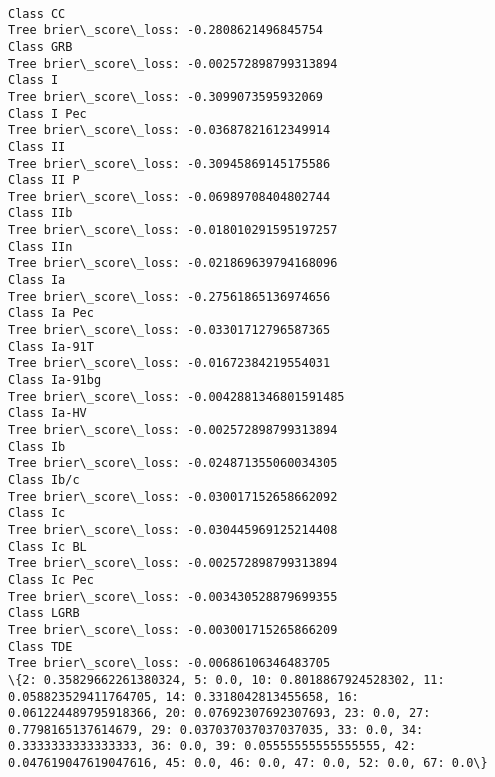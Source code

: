 \documentclass[11pt]{article}
\begin{document}
    \begin{center}
    \end{center}
    { \hspace*{\fill} \\}
    
    \begin{Verbatim}[commandchars=\\\{\}]
Class CC
Tree brier\_score\_loss: -0.2808621496845754
Class GRB
Tree brier\_score\_loss: -0.002572898799313894
Class I
Tree brier\_score\_loss: -0.3099073595932069
Class I Pec
Tree brier\_score\_loss: -0.03687821612349914
Class II
Tree brier\_score\_loss: -0.30945869145175586
Class II P
Tree brier\_score\_loss: -0.06989708404802744
Class IIb
Tree brier\_score\_loss: -0.018010291595197257
Class IIn
Tree brier\_score\_loss: -0.021869639794168096
Class Ia
Tree brier\_score\_loss: -0.27561865136974656
Class Ia Pec
Tree brier\_score\_loss: -0.03301712796587365
Class Ia-91T
Tree brier\_score\_loss: -0.01672384219554031
Class Ia-91bg
Tree brier\_score\_loss: -0.0042881346801591485
Class Ia-HV
Tree brier\_score\_loss: -0.002572898799313894
Class Ib
Tree brier\_score\_loss: -0.024871355060034305
Class Ib/c
Tree brier\_score\_loss: -0.030017152658662092
Class Ic
Tree brier\_score\_loss: -0.030445969125214408
Class Ic BL
Tree brier\_score\_loss: -0.002572898799313894
Class Ic Pec
Tree brier\_score\_loss: -0.003430528879699355
Class LGRB
Tree brier\_score\_loss: -0.003001715265866209
Class TDE
Tree brier\_score\_loss: -0.00686106346483705
\{2: 0.35829662261380324, 5: 0.0, 10: 0.8018867924528302, 11: 0.058823529411764705, 14: 0.3318042813455658, 16: 0.061224489795918366, 20: 0.07692307692307693, 23: 0.0, 27: 0.7798165137614679, 29: 0.037037037037037035, 33: 0.0, 34: 0.3333333333333333, 36: 0.0, 39: 0.05555555555555555, 42: 0.047619047619047616, 45: 0.0, 46: 0.0, 47: 0.0, 52: 0.0, 67: 0.0\}

    \end{Verbatim}

    \begin{center}
    \end{center}
    { \hspace*{\fill} \\}
    
    \begin{center}
    \end{center}
    { \hspace*{\fill} \\}
    
\end{document}

